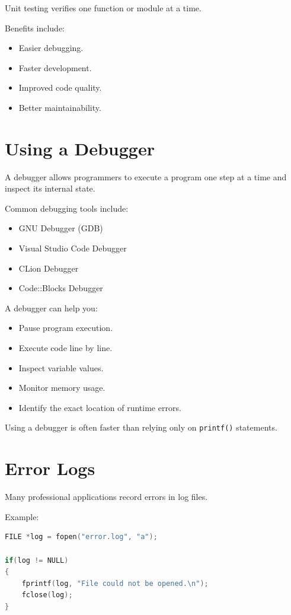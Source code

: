 \documentclass[12pt,openany]{book}
\begin{document}
Unit testing verifies one function or module at a time.

Benefits include:

\begin{itemize}
    \item Easier debugging.
    \item Faster development.
    \item Improved code quality.
    \item Better maintainability.
\end{itemize}
\section{Using a Debugger}

A debugger allows programmers to execute a program one step at a time and inspect its internal state.

Common debugging tools include:

\begin{itemize}
    \item GNU Debugger (GDB)
    \item Visual Studio Code Debugger
    \item CLion Debugger
    \item Code::Blocks Debugger
\end{itemize}

A debugger can help you:

\begin{itemize}
    \item Pause program execution.
    \item Execute code line by line.
    \item Inspect variable values.
    \item Monitor memory usage.
    \item Identify the exact location of runtime errors.
\end{itemize}

Using a debugger is often faster than relying only on \texttt{printf()} statements.

\section{Error Logs}

Many professional applications record errors in log files.

Example:

\begin{lstlisting}[language=C]
FILE *log = fopen("error.log", "a");

if(log != NULL)
{
    fprintf(log, "File could not be opened.\n");
    fclose(log);
}
\end{lstlisting}
\end{document}

